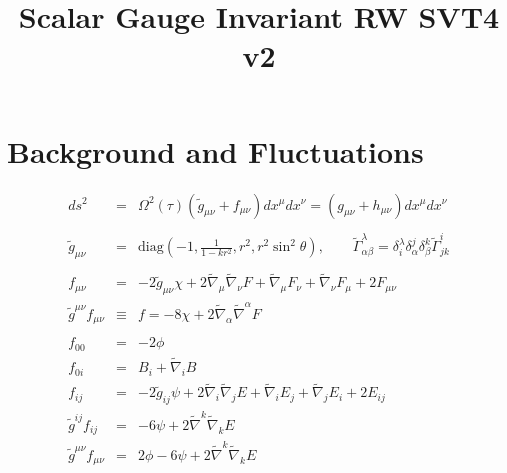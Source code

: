 \documentclass[10pt,letterpaper]{article}
\title{Scalar Gauge Invariant RW SVT4 v2}
\date{}
\numberwithin{equation}{section}
\begin{document}
 
\maketitle
\noindent 

\section{Background and Fluctuations}
\begin{eqnarray}
ds^2 &=& \Omega^2(\tau)(\tilde g_{\mu\nu} + f_{\mu\nu})dx^\mu dx^\nu = (g_{\mu\nu} +h_{\mu\nu}) dx^\mu dx^\nu
\\ \nonumber\\
\tilde g_{\mu\nu} &=& \text{diag}\left(-1,\frac{1}{1-kr^2}, r^2, r^2\sin^2\theta\right),\qquad \tilde \Gamma^{\lambda}_{\alpha\beta} = \delta^\lambda_i \delta^j_\alpha \delta^k_\beta \tilde \Gamma^{i}_{jk}
\\ \nonumber\\
f_{\mu\nu} &=& -2\tilde g_{\mu\nu}\chi + 2\tilde\nabla_\mu\tilde\nabla_\nu F + \tilde\nabla_\mu F_\nu + \tilde\nabla_\nu F_{\mu} +2F_{\mu\nu}
\nonumber\\
\tilde g^{\mu\nu}f_{\mu\nu} &\equiv&f = -8\chi + 2 \tilde\nabla_\alpha\tilde\nabla^\alpha F
\\ \nonumber\\
f_{00} &=& -2\phi
\nonumber\\
f_{0i} &=& B_i + \tilde\nabla_i B
\nonumber\\
f_{ij} &=& -2\tilde g_{ij} \psi + 2\tilde\nabla_i\tilde\nabla_j E + \tilde\nabla_i E_j + \tilde\nabla_j E_i + 2E_{ij}
\nonumber\\
\tilde g^{ij} f_{ij} &=& -6\psi + 2\tilde\nabla^k\tilde\nabla_k E
\nonumber\\
\tilde g^{\mu\nu} f_{\mu\nu} &=& 2\phi-6\psi + 2\tilde\nabla^k\tilde\nabla_k E
\end{eqnarray}

\end{document}
